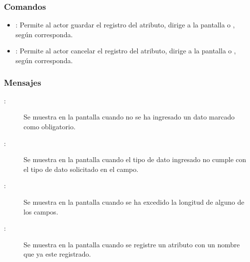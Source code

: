 \subsubsection{Comandos}
\begin{itemize}
	\item {}: Permite al actor guardar el registro del atributo, dirige a la pantalla  o , según corresponda.
	\item {}: Permite al actor cancelar el registro del atributo, dirige a la pantalla  o , según corresponda.
\end{itemize}

\subsubsection{Mensajes}

	
\begin{description}
	\item[:] Se muestra en la pantalla  cuando no se ha ingresado un dato marcado como obligatorio.
	\item[:] Se muestra en la pantalla  cuando el tipo de dato ingresado no cumple con el tipo de dato solicitado en el campo.
	\item[:] Se muestra en la pantalla  cuando se ha excedido la longitud de alguno de los campos.
	\item[:] Se muestra en la pantalla  cuando se registre un atributo con un nombre que ya este registrado.
\end{description}
